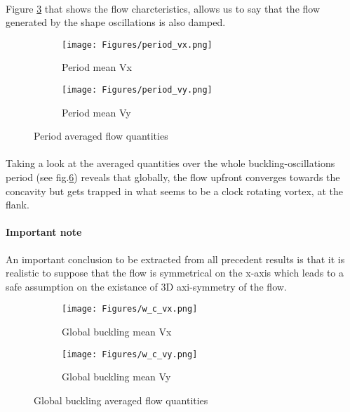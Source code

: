 \documentclass[a4paper,10pt]{report}
\begin{document}
\paragraph{}
Figure \ref{fig:PeriodAveragedquantities} that shows the flow charcteristics, allows us to say that the flow generated by the shape oscillations is also damped.
\begin{figure}[htbp]%
	\centering%
	 \begin{subfigure}[t]{0.5\textwidth}%
        \texttt{[image: Figures/period\_vx.png]}%
        \caption{Period mean Vx}%
				\label{fig:PeriodVx}%
    \end{subfigure}%
    \begin{subfigure}[t]{0.5\textwidth}%
        \texttt{[image: Figures/period\_vy.png]}%
        \caption{Period mean Vy}%
        \label{fig:PeriodVy}%
    \end{subfigure}%
		\caption{Period averaged flow quantities}%
		\label{fig:PeriodAveragedquantities}%
\end{figure}

\paragraph{}
Taking a look at the averaged quantities over the whole buckling-oscillations period (see fig.\ref{fig:GlobalAveragedquantities}) reveals that globally, the flow upfront converges towards the concavity but gets trapped in what seems to be a clock rotating vortex, at the flank.
\paragraph{Important note}
An important conclusion to be extracted from all precedent results is that it is realistic to suppose that the flow is symmetrical on the x-axis which leads to a safe assumption on the existance of 3D axi-symmetry of the flow.

\begin{figure}[htbp]%
	\centering%
	 \begin{subfigure}[t]{0.5\textwidth}%
        \texttt{[image: Figures/w\_c\_vx.png]}%
        \caption{Global buckling mean Vx}%
				\label{fig:GlobalVx}%
    \end{subfigure}%
    \begin{subfigure}[t]{0.5\textwidth}%
        \texttt{[image: Figures/w\_c\_vy.png]}%
        \caption{Global buckling mean Vy}%
        \label{fig:GlobalVy}%
    \end{subfigure}%
		\caption{Global buckling averaged flow quantities}%
		\label{fig:GlobalAveragedquantities}%
\end{figure}
\end{document}
